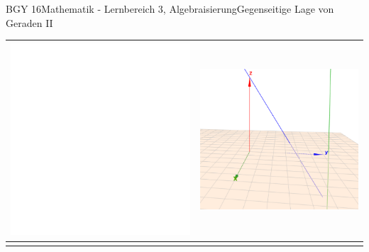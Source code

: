 \documentclass[oneside,openany,headings=optiontotoc,11pt,numbers=noenddot]{scrreprt}
\begin{document}
\begin{worksheet}{BGY 16}{Mathematik - Lernbereich 3, Algebraisierung}{Gegenseitige Lage von Geraden II}
\begin{framed}
\begin{center}
\begin{tabularx}{\textwidth}{Xr}
					\includegraphics[scale=0.36]{../empty.jpg} &
					\includegraphics[scale=0.46]{Bilder/ghWindschief3D.png}\\
					\hline\\

\end{tabularx}
\end{center}
\end{framed}
\end{worksheet}
\end{document}
